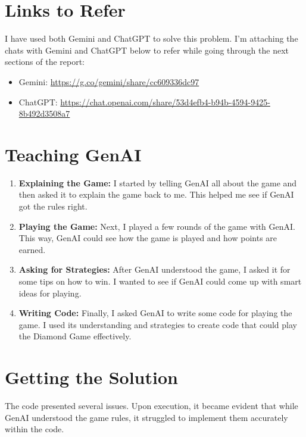 \documentclass{article}
\begin{document}
\section{Links to Refer}
I have used both Gemini and ChatGPT to solve this problem. I’m attaching the chats with Gemini and ChatGPT below to refer while going through the next sections of the report:

\begin{itemize}
    \item Gemini: \url{https://g.co/gemini/share/cc609336dc97}
    \item ChatGPT: \url{https://chat.openai.com/share/53d4efb4-b94b-4594-9425-8b492d3508a7}
\end{itemize}

\section{Teaching GenAI}

\begin{enumerate}
    \item \textbf{Explaining the Game:} I started by telling GenAI all about the game and then asked it to explain the game back to me. This helped me see if GenAI got the rules right.
    \item \textbf{Playing the Game:} Next, I played a few rounds of the game with GenAI. This way, GenAI could see how the game is played and how points are earned.
    \item \textbf{Asking for Strategies:} After GenAI understood the game, I asked it for some tips on how to win. I wanted to see if GenAI could come up with smart ideas for playing.
    \item \textbf{Writing Code:} Finally, I asked GenAI to write some code for playing the game. I used its understanding and strategies to create code that could play the Diamond Game effectively.
\end{enumerate}

\section{Getting the Solution}

The code presented several issues. Upon execution, it became evident that while GenAI understood the game rules, it struggled to implement them accurately within the code.
\end{document}
